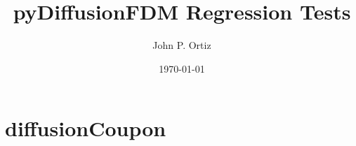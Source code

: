 \documentclass{article}
\title{pyDiffusionFDM Regression Tests}
\author{John P. Ortiz}
\date{\today}
\begin{document}
\maketitle
\section{diffusionCoupon}

\end{document}
